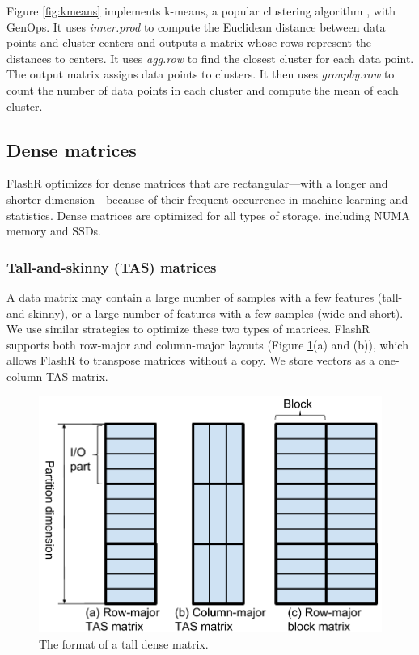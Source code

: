 Figure \ref{fig:kmeans} implements k-means, a popular clustering algorithm
\cite{kmeans}, with GenOps. It uses \textit{inner.prod} to
compute the Euclidean distance between data points and cluster centers
and outputs a matrix whose rows represent the distances to centers.  
It uses \textit{agg.row} to find the closest cluster for each data point.
The output matrix 
assigns data points to clusters. It then uses \textit{groupby.row} to count
the number of data points in each cluster and compute the mean of each cluster.

\subsection{Dense matrices}
FlashR optimizes for dense matrices that are rectangular---with
a longer and shorter dimension---because of their frequent occurrence
in machine learning and statistics. Dense matrices are optimized for
all types of storage, including NUMA memory and SSDs.

\subsubsection{Tall-and-skinny (TAS) matrices}
A data matrix may contain a large number of samples with a few features
(tall-and-skinny),
or a large number of features with a few samples (wide-and-short).
We use similar strategies to optimize these two types of matrices. FlashR
supports both row-major and column-major layouts (Figure \ref{fig:den_mat}(a)
and (b)), which allows FlashR to transpose matrices without a copy.
We store vectors as a one-column TAS matrix.

\begin{figure}
	\centering
	\includegraphics[scale=0.5]{FlashMatrix_figs/dense_matrix2.pdf}
	\vspace{-5pt}
	\caption{The format of a tall dense matrix.}
	\label{fig:den_mat}
  \vspace{-12pt}
\end{figure}


